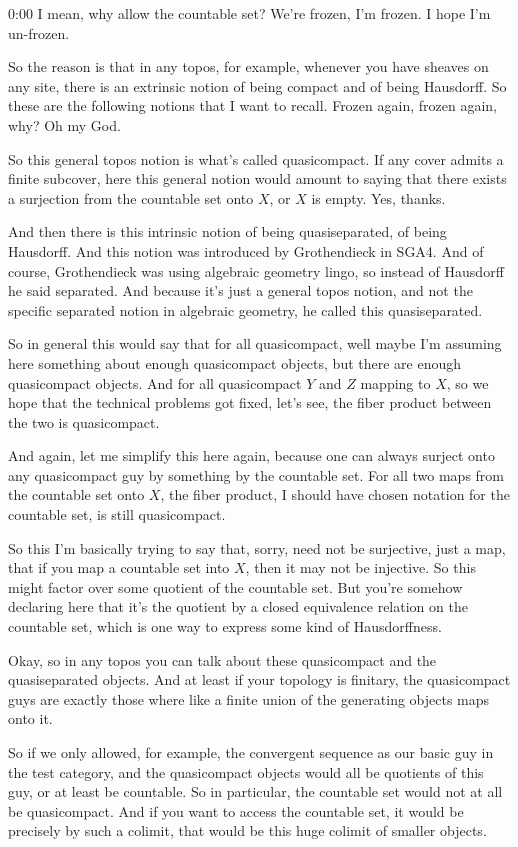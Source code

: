 \begin{unfinished}{0:00}
I mean, why allow the countable set? We're frozen, I'm frozen. I hope I'm un-frozen.

So the reason is that in any topos, for example, whenever you have sheaves on any site, there is an extrinsic notion of being compact and of being Hausdorff. So these are the following notions that I want to recall. Frozen again, frozen again, why? Oh my God.

So this general topos notion is what's called quasicompact. If any cover admits a finite subcover, here this general notion would amount to saying that there exists a surjection from the countable set onto $X$, or $X$ is empty. Yes, thanks.

And then there is this intrinsic notion of being quasiseparated, of being Hausdorff. And this notion was introduced by Grothendieck in SGA4. And of course, Grothendieck was using algebraic geometry lingo, so instead of Hausdorff he said separated. And because it's just a general topos notion, and not the specific separated notion in algebraic geometry, he called this quasiseparated.

So in general this would say that for all quasicompact, well maybe I'm assuming here something about enough quasicompact objects, but there are enough quasicompact objects. And for all quasicompact $Y$ and $Z$ mapping to $X$, so we hope that the technical problems got fixed, let's see, the fiber product between the two is quasicompact.

And again, let me simplify this here again, because one can always surject onto any quasicompact guy by something by the countable set. For all two maps from the countable set onto $X$, the fiber product, I should have chosen notation for the countable set, is still quasicompact.

So this I'm basically trying to say that, sorry, need not be surjective, just a map, that if you map a countable set into $X$, then it may not be injective. So this might factor over some quotient of the countable set. But you're somehow declaring here that it's the quotient by a closed equivalence relation on the countable set, which is one way to express some kind of Hausdorffness.

Okay, so in any topos you can talk about these quasicompact and the quasiseparated objects. And at least if your topology is finitary, the quasicompact guys are exactly those where like a finite union of the generating objects maps onto it.

So if we only allowed, for example, the convergent sequence as our basic guy in the test category, and the quasicompact objects would all be quotients of this guy, or at least be countable. So in particular, the countable set would not at all be quasicompact. And if you want to access the countable set, it would be precisely by such a colimit, that would be this huge colimit of smaller objects.


\end{unfinished}
